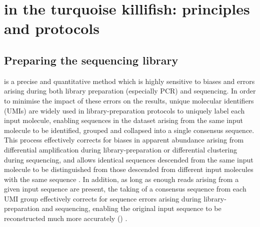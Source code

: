 \section{\igseq in the turquoise killifish: principles and protocols}
\label{sec:igseq_protocol}

\subsection{Preparing the sequencing library}
\label{sec:igseq_protocol_library}


\IGSEQ is a precise and quantitative method which is highly sensitive to biases and errors arising during both library preparation (especially PCR) and sequencing. In order to minimise the impact of these errors on the results, unique molecular identifiers (UMIs) are widely used in \igseq library-preparation protocols to uniquely label each input molecule, enabling sequences in the dataset arising from the same input molecule to be identified, grouped and collapsed into a single consensus sequence. This process effectively corrects for biases in apparent abundance arising from differential amplification during library-preparation or differential clustering during sequencing, and allows identical sequences descended from the same input molecule to be distinguished from those descended from different input molecules with the same sequence \parencite{vollmers2013consensus}. In addition, as long as enough reads arising from a given input sequence are present, the taking of a consensus sequence from each UMI group effectively corrects for sequence errors arising during library-preparation and sequencing, enabling the original input sequence to be reconstructed much more accurately () \parencite{vollmers2013consensus,turchaninova2016igprep}.

